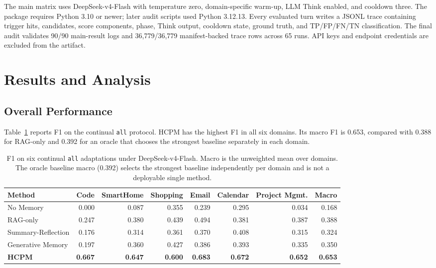 \documentclass[sigconf,anonymous,review]{acmart}
\newcommand{\system}{HCPM}
\begin{document}
The main matrix uses DeepSeek-v4-Flash with temperature zero, domain-specific warm-up, LLM Think enabled, and cooldown three.
The package requires Python 3.10 or newer; later audit scripts used Python 3.12.13.
Every evaluated turn writes a JSONL trace containing trigger hits, candidates, score components, phase, Think output, cooldown state, ground truth, and TP/FP/FN/TN classification.
The final audit validates 90/90 main-result logs and 36,779/36,779 manifest-backed trace rows across 65 runs.
API keys and endpoint credentials are excluded from the artifact.

\section{Results and Analysis}

\subsection{Overall Performance}

Table~\ref{tab:main} reports F1 on the continual \texttt{all} protocol.
\system{} has the highest F1 in all six domains.
Its macro F1 is 0.653, compared with 0.388 for RAG-only and 0.392 for an oracle that chooses the strongest baseline separately in each domain.

\begin{table}[t]
\centering
\caption{F1 on six continual \texttt{all} adaptations under DeepSeek-v4-Flash. Macro is the unweighted mean over domains. The oracle baseline macro (0.392) selects the strongest baseline independently per domain and is not a deployable single method.}
\label{tab:main}
\small
\begin{tabular}{lrrrrrrr}
\toprule
Method & Code & SmartHome & Shopping & Email & Calendar & Project Mgmt. & Macro \\
\midrule
No Memory & 0.000 & 0.087 & 0.355 & 0.239 & 0.295 & 0.034 & 0.168 \\
RAG-only & 0.247 & 0.380 & 0.439 & 0.494 & 0.381 & 0.387 & 0.388 \\
Summary-Reflection & 0.176 & 0.314 & 0.361 & 0.370 & 0.408 & 0.315 & 0.324 \\
Generative Memory & 0.197 & 0.360 & 0.427 & 0.386 & 0.393 & 0.335 & 0.350 \\
\textbf{HCPM} & \textbf{0.667} & \textbf{0.647} & \textbf{0.600} & \textbf{0.683} & \textbf{0.672} & \textbf{0.652} & \textbf{0.653} \\
\bottomrule
\end{tabular}
\end{table}
\end{document}
